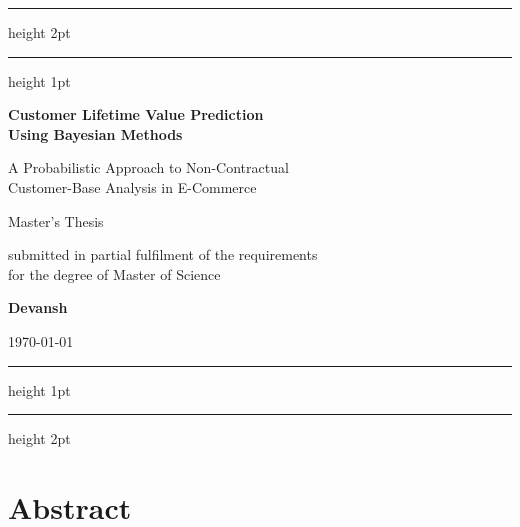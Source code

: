 \documentclass[12pt, a4paper, oneside]{report}
\begin{document}

\begin{titlepage}
  \centering
  \vspace*{1cm}
  {\color{bayesblue}\hrule height 2pt}
  \vspace{0.3cm}
  {\color{bayesblue}\hrule height 1pt}
  \vspace{2cm}

  {\LARGE\bfseries Customer Lifetime Value Prediction\\[0.3cm] Using Bayesian Methods\par}
  \vspace{0.8cm}
  {\large A Probabilistic Approach to Non-Contractual\\ Customer-Base Analysis in E-Commerce\par}

  \vspace{2.5cm}
  {\large Master's Thesis\par}
  \vspace{0.5cm}
  {\large submitted in partial fulfilment of the requirements\\ for the degree of Master of Science\par}

  \vspace{2.5cm}
  {\large\bfseries Devansh\par}

  \vfill
  {\large \today\par}
  \vspace{1cm}
  {\color{bayesblue}\hrule height 1pt}
  \vspace{0.3cm}
  {\color{bayesblue}\hrule height 2pt}
\end{titlepage}

\chapter*{Abstract}
\end{document}
